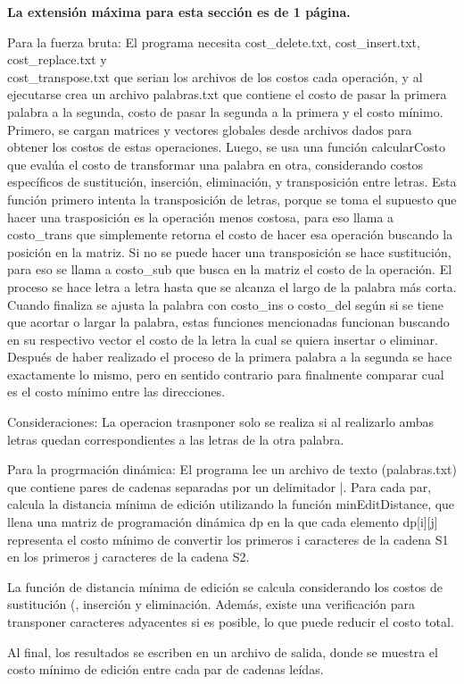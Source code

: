 \begin{mdframed}
    \textbf{La extensión máxima para esta sección es de 1 página.}
\end{mdframed}

Para la fuerza bruta:
El programa necesita cost\_delete.txt, cost\_insert.txt, cost\_replace.txt y \\ cost\_transpose.txt que serian los archivos de los costos cada operación, y al ejecutarse crea un archivo palabras.txt que contiene el costo de pasar la primera palabra a la segunda, costo de pasar la segunda a la primera y el costo mínimo. 
Primero, se cargan matrices y vectores globales desde archivos dados para obtener los costos de estas operaciones. Luego, se usa una función calcularCosto que evalúa el costo de transformar una palabra en otra, considerando costos específicos de sustitución, inserción, eliminación, y transposición entre letras. Esta función primero intenta la transposición de letras, porque se toma el supuesto que hacer una trasposición es la operación menos costosa, para eso llama a costo\_trans que simplemente retorna el costo de hacer esa operación buscando la posición en la matriz. Si no se puede hacer una transposición se hace sustitución, para eso se llama a costo\_sub que busca en la matriz el costo de la operación. El proceso se hace letra a letra hasta que se alcanza el largo de la palabra más corta. Cuando finaliza se ajusta la palabra con costo\_ins o costo\_del según si se tiene que acortar o largar la palabra, estas funciones mencionadas funcionan buscando en su respectivo vector el costo de la letra la cual se quiera insertar o eliminar. Después de haber realizado el proceso de la primera palabra a la segunda se hace exactamente lo mismo, pero en sentido contrario para finalmente comparar cual es el costo mínimo entre las direcciones.   

Consideraciones: La operacion trasnponer solo se realiza si al realizarlo ambas letras quedan correspondientes a las letras de la otra palabra.

Para la progrmación dinámica:
El programa lee un archivo de texto (palabras.txt) que contiene pares de cadenas separadas por un delimitador |. Para cada par, calcula la distancia mínima de edición utilizando la función minEditDistance, que llena una matriz de programación dinámica dp en la que cada elemento dp[i][j] representa el costo mínimo de convertir los primeros i caracteres de la cadena S1 en los primeros j caracteres de la cadena S2.

La función de distancia mínima de edición se calcula considerando los costos de sustitución (, inserción  y eliminación. Además, existe una verificación para transponer caracteres adyacentes si es posible, lo que puede reducir el costo total.

Al final, los resultados se escriben en un archivo de salida, donde se muestra el costo mínimo de edición entre cada par de cadenas leídas.